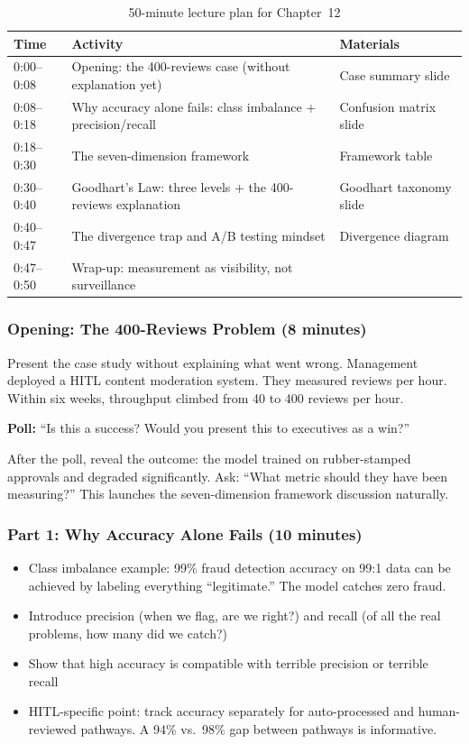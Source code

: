 \begin{table}[htbp]
\caption{50-minute lecture plan for Chapter~12}
\label{tab:lecture-plan-ch12}
\centering
\begin{tabular}{@{}p{2.5cm}p{6cm}p{3.5cm}@{}}
\toprule
\textbf{Time} & \textbf{Activity} & \textbf{Materials} \\
\midrule
0:00--0:08 & Opening: the 400-reviews case (without explanation yet) & Case summary slide \\
0:08--0:18 & Why accuracy alone fails: class imbalance + precision/recall & Confusion matrix slide \\
0:18--0:30 & The seven-dimension framework & Framework table \\
0:30--0:40 & Goodhart's Law: three levels + the 400-reviews explanation & Goodhart taxonomy slide \\
0:40--0:47 & The divergence trap and A/B testing mindset & Divergence diagram \\
0:47--0:50 & Wrap-up: measurement as visibility, not surveillance & \\
\bottomrule
\end{tabular}
\end{table}

\subsubsection{Opening: The 400-Reviews Problem (8 minutes)}

Present the case study without explaining what went wrong. Management deployed a HITL content moderation system. They measured reviews per hour. Within six weeks, throughput climbed from 40 to 400 reviews per hour.

\begin{trythis}
\textbf{Poll:} ``Is this a success? Would you present this to executives as a win?''

After the poll, reveal the outcome: the model trained on rubber-stamped approvals and degraded significantly. Ask: ``What metric should they have been measuring?'' This launches the seven-dimension framework discussion naturally.
\end{trythis}

\subsubsection{Part 1: Why Accuracy Alone Fails (10 minutes)}

\begin{itemize}
    \item Class imbalance example: 99\% fraud detection accuracy on 99:1 data can be achieved by labeling everything ``legitimate.'' The model catches zero fraud.
    \item Introduce precision (when we flag, are we right?) and recall (of all the real problems, how many did we catch?)
    \item Show that high accuracy is compatible with terrible precision or terrible recall
    \item HITL-specific point: track accuracy separately for auto-processed and human-reviewed pathways. A 94\% vs.\ 98\% gap between pathways is informative.
\end{itemize}


